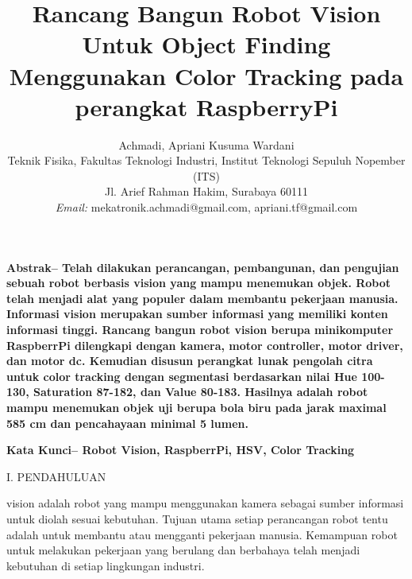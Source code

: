 \documentclass[10pt,journal,compsoc]{IEEEtran}
\begin{document}
 \title{Rancang Bangun Robot Vision Untuk Object Finding Menggunakan Color Tracking pada perangkat RaspberryPi}

 \author{
 Achmadi, Apriani Kusuma Wardani\\
 Teknik Fisika, Fakultas Teknologi Industri, Institut Teknologi Sepuluh Nopember (ITS)\\
 Jl. Arief Rahman Hakim, Surabaya 60111\\
 \textit{Email:} mekatronik.achmadi@gmail.com, apriani.tf@gmail.com
 }
 
 
%   
%   
  
  \maketitle
  
 
 \textbf{
 Abstrak--
 Telah dilakukan perancangan, pembangunan, dan pengujian sebuah robot berbasis vision yang mampu menemukan objek. 
 Robot telah menjadi alat yang populer dalam membantu pekerjaan manusia.
 Informasi vision merupakan sumber informasi yang memiliki konten informasi tinggi.
 Rancang bangun robot vision berupa minikomputer RaspberrPi dilengkapi dengan kamera, motor controller, motor driver, dan motor dc.
 Kemudian disusun perangkat lunak pengolah citra untuk color tracking dengan segmentasi berdasarkan nilai Hue 100-130, Saturation 87-182, dan Value 80-183.
 Hasilnya adalah robot mampu menemukan objek uji berupa bola biru pada jarak maximal 585 cm dan pencahayaan minimal 5 lumen.
 }
 
 \textbf{
 Kata Kunci--
 Robot Vision,
 RaspberrPi,
 HSV,
 Color Tracking
 }
 
 \begin{center}
     I. PENDAHULUAN
  \end{center}
  
   vision adalah robot yang mampu menggunakan kamera sebagai sumber informasi untuk diolah sesuai kebutuhan. 
  Tujuan utama setiap perancangan robot tentu adalah untuk membantu atau mengganti pekerjaan manusia. 
  Kemampuan robot untuk melakukan pekerjaan yang berulang dan berbahaya telah menjadi kebutuhan di setiap lingkungan industri.
  
\end{document}
